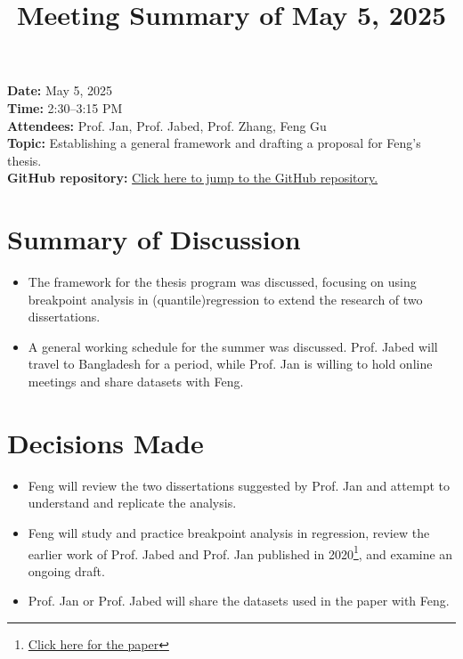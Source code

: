\documentclass[11pt]{article}
\title{Meeting Summary of May 5, 2025}
\date{}  %
\author{}
\begin{document}
\maketitle

\noindent
\textbf{Date:} May 5, 2025 \\
\textbf{Time:} 2:30--3:15 PM \\
\textbf{Attendees:} Prof. Jan, Prof. Jabed, Prof. Zhang, Feng Gu \\
\textbf{Topic:} Establishing a general framework and drafting a proposal for Feng's thesis.\\
\textbf{GitHub repository:} \href{https://github.com/Gufeng-2002/Thesis_Meeting_Notes/tree/main/May_5th_25_meeting1}{Click here to jump to the GitHub repository.}

\vspace{1em}

\section*{Summary of Discussion}
\begin{itemize}[leftmargin=1.5em]
    \item The framework for the thesis program was discussed, focusing on using breakpoint analysis in (quantile)regression to extend the research of two dissertations.
    \item A general working schedule for the summer was discussed. Prof. Jabed will travel to Bangladesh for a period, while Prof. Jan is willing to hold online meetings and share datasets with Feng.
\end{itemize}

\section*{Decisions Made}
\begin{itemize}[leftmargin=1.5em]
    \item Feng will review the two dissertations suggested by Prof. Jan and attempt to understand and replicate the analysis.
    \item Feng will study and practice breakpoint analysis in regression, review the earlier work of Prof. Jabed and Prof. Jan published in 2020\footnote{\href{https://onlinelibrary.wiley.com/doi/epdf/10.1002/ece3.6955}{Click here for the paper}}, and examine an ongoing draft.
    \item Prof. Jan or Prof. Jabed will share the datasets used in the paper with Feng.
\end{itemize}
\end{document}
